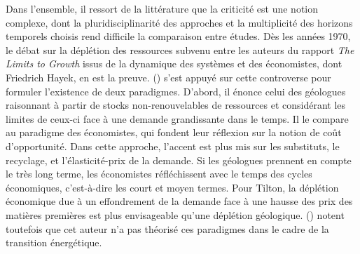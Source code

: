 Dans l'ensemble, il ressort de la littérature que la criticité est une notion complexe, dont la pluridisciplinarité des approches et la multiplicité des horizons temporels choisis rend difficile la comparaison entre études. Dès les années 1970, le débat sur la déplétion des ressources subvenu entre les auteurs du rapport \textit{The Limits to Growth} issus de la dynamique des systèmes et des économistes, dont Friedrich Hayek, en est la preuve. (\cite{tilton_assessing_2003}) s'est appuyé sur cette controverse pour formuler l'existence de deux paradigmes. D'abord, il énonce celui des géologues raisonnant à partir de stocks non-renouvelables de ressources et considérant les limites de ceux-ci face à une demande grandissante dans le temps. Il le compare au paradigme des économistes, qui fondent leur réflexion sur la notion de coût d'opportunité. Dans cette approche, l'accent est plus mis sur les substituts, le recyclage, et l'élasticité-prix de la demande. Si les géologues prennent en compte le très long terme, les économistes réfléchissent avec le temps des cycles économiques, c'est-à-dire les court et moyen termes. Pour Tilton, la déplétion économique due à un effondrement de la demande face à une hausse des prix des matières premières est plus envisageable qu'une déplétion géologique. (\cite{hache_vers_2019}) notent toutefois que cet auteur n'a pas théorisé ces paradigmes dans le cadre de la transition énergétique.

